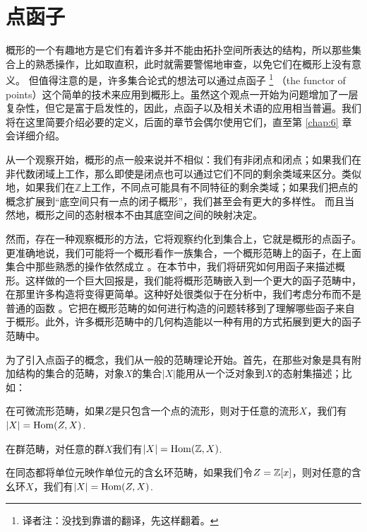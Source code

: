 \section{点函子}

概形的一个有趣地方是它们有着许多并不能由拓扑空间所表达的结构，所以那些集合上的熟悉操作，比如取直积，此时就需要警惕地审查，以免它们在概形上没有意义。 但值得注意的是，许多集合论式的想法可以通过点函子
\footnote{译者注：没找到靠谱的翻译，先这样翻着。}
（the functor of points）这个简单的技术来应用到概形上。虽然这个观点一开始为问题增加了一层复杂性，但它是富于启发性的，因此，点函子以及相关术语的应用相当普遍。我们将在这里简要介绍必要的定义，后面的章节会偶尔使用它们，直至第 \ref{chap:6} 章会详细介绍。

从一个观察开始，概形的点一般来说并不相似：我们有非闭点和闭点；如果我们在非代数闭域上工作，那么即使是闭点也可以通过它们不同的剩余类域来区分。类似地，如果我们在$\mathbb{Z}$上工作，不同点可能具有不同特征的剩余类域；如果我们把点的概念扩展到“底空间只有一点的闭子概形”，我们甚至会有更大的多样性。 而且当然地，概形之间的态射根本不由其底空间之间的映射决定。

然而，存在一种观察概形的方法，它将观察约化到集合上，它就是概形的点函子。更准确地说，我们可能将一个概形看作一族集合，一个概形范畴上的函子，在上面集合中那些熟悉的操作依然成立%
。在本节中，我们将研究如何用函子来描述概形。这样做的一个巨大回报是，我们能将概形范畴嵌入到一个更大的函子范畴中，在那里许多构造将变得更简单。这种好处很类似于在分析中，我们考虑分布而不是普通的函数%
。它把在概形范畴的如何进行构造的问题转移到了理解哪些函子来自于概形。此外，许多概形范畴中的几何构造能以一种有用的方式拓展到更大的函子范畴中。

为了引入点函子的概念，我们从一般的范畴理论开始。首先，在那些对象是具有附加结构的集合的范畴，对象$X$的集合$|X|$能用从一个泛对象到$X$的态射集描述；比如：
\begin{compactenum}[(a)]
\item 在可微流形范畴，如果$Z$是只包含一个点的流形，则对于任意的流形$X$，我们有$|X|=\operatorname{Hom}(Z,X)$.
\item 在群范畴，对任意的群$X$我们有$|X|=\operatorname{Hom}(\mathbb{Z},X)$.
\item 在同态都将单位元映作单位元的含幺环范畴，如果我们令$Z=\mathbb{Z}[x]$，则对任意的含幺环$X$，我们有$|X|=\operatorname{Hom}(Z,X)$.
\end{compactenum}

